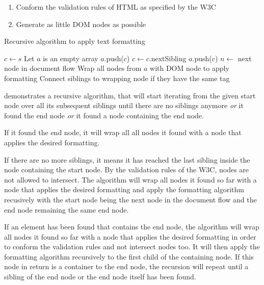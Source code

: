 \begin{enumerate}
\item Conform the validation rules of HTML as specified by the W3C
\item Generate as little DOM nodes as possible
\end{enumerate}

\begin{algorithm}
\caption{Recursive algorithm to apply text formatting}
\label{alg:text_formatting}
\begin{algorithmic}[1]
    \State $c \gets s$
    \State Let $a$ is an empty array
      \State $a$.push($c$)
      \State $c \gets c$.nextSibling
     \EndWhile
      \State $a$.push($c$)
     \EndIf
      \State {}
     \EndIf
      \State $n \gets $ next node in document flow
      \State {}
     \EndIf
     \State Wrap all nodes from $a$ with DOM node to apply formatting
     \State Connect siblings to wrapping node if they have the same tag
  \EndProcedure
\end{algorithmic}
\end{algorithm}

 demonstrates a recursive algorithm, that will start iterating from the given start node over all its subsequent siblings until there are no siblings anymore \textit{or} it found the end node \textit{or} it found a node containing the end node.

If it found the end node, it will wrap all all nodes it found with a node that applies the desired formatting.

If there are no more siblings, it means it has reached the last sibling inside the node containing the start node. By the validation rules of the W3C, nodes are not allowed to intersect. The algorithm will wrap all nodes it found so far with a node that applies the desired formatting and apply the formatting algorithm recusively with the start node being the next node in the document flow and the end node remaining the same end node.

If an element has been found that contains the end node, the algorithm will wrap all nodes it found so far with a node that applies the desired formatting in order to conform the validation rules and not intersect nodes too. It will then apply the formatting algorithm recursively to the first child of the containing node. If this node in return is a container to the end node, the recursion will repeat until a sibling of the end node or the end node itself has been found.

